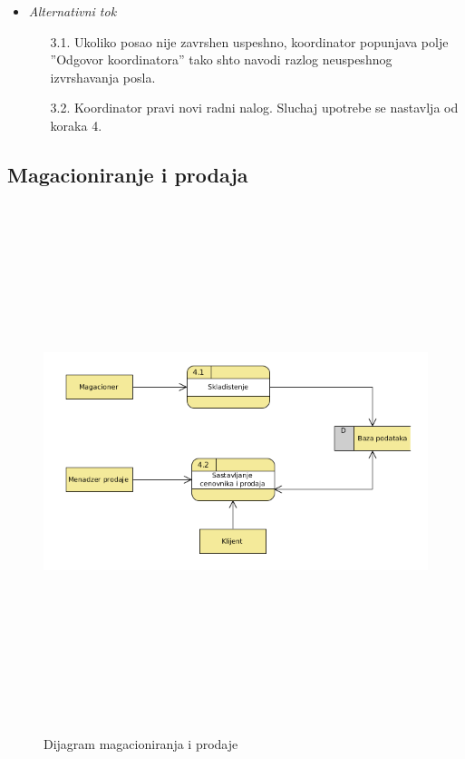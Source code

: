 \documentclass[10 pt]{article}
\begin{document}
\begin{itemize}
			\item\textit{Alternativni tok}
				\begin{enumerate}
					\item [3.1.] Ukoliko posao nije zavrshen uspeshno,
					koordinator popunjava polje ''Odgovor koordinatora'' tako shto navodi razlog neuspeshnog izvrshavanja posla.
					\item [3.2.] Koordinator pravi novi radni nalog.
					Sluchaj upotrebe se nastavlja od koraka 4.		
				\end{enumerate}
			
		\end{itemize}
	
	
	\subsection{Magacioniranje i prodaja}
	
		\begin{figure}[H]
			\centering
			\includegraphics[width=15cm,height=15cm,keepaspectratio]{slike/DTPMagacioniranje.png}\\
			\caption{Dijagram magacioniranja i prodaje}
		\end{figure}
	
\end{document}
